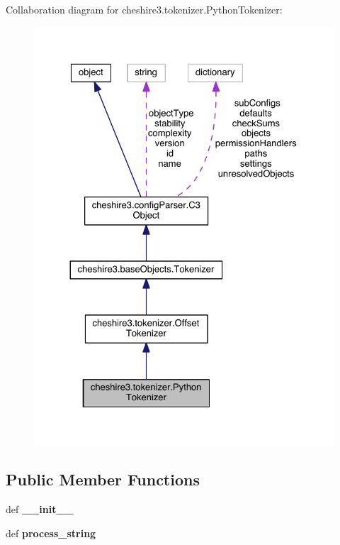 Collaboration diagram for cheshire3.\-tokenizer.\-Python\-Tokenizer\-:
\nopagebreak
\begin{figure}[H]
\begin{center}
\leavevmode
\includegraphics[width=326pt]{classcheshire3_1_1tokenizer_1_1_python_tokenizer__coll__graph}
\end{center}
\end{figure}
\subsection*{Public Member Functions}
\begin{DoxyCompactItemize}
\item 
\hypertarget{classcheshire3_1_1tokenizer_1_1_python_tokenizer_a1feda180037eafe6018c40471cc37f02}{def {\bfseries \-\_\-\-\_\-init\-\_\-\-\_\-}}\label{classcheshire3_1_1tokenizer_1_1_python_tokenizer_a1feda180037eafe6018c40471cc37f02}

\item 
\hypertarget{classcheshire3_1_1tokenizer_1_1_python_tokenizer_a7513005be258827f581179ffcc793df7}{def {\bfseries process\-\_\-string}}\label{classcheshire3_1_1tokenizer_1_1_python_tokenizer_a7513005be258827f581179ffcc793df7}

\end{DoxyCompactItemize}

